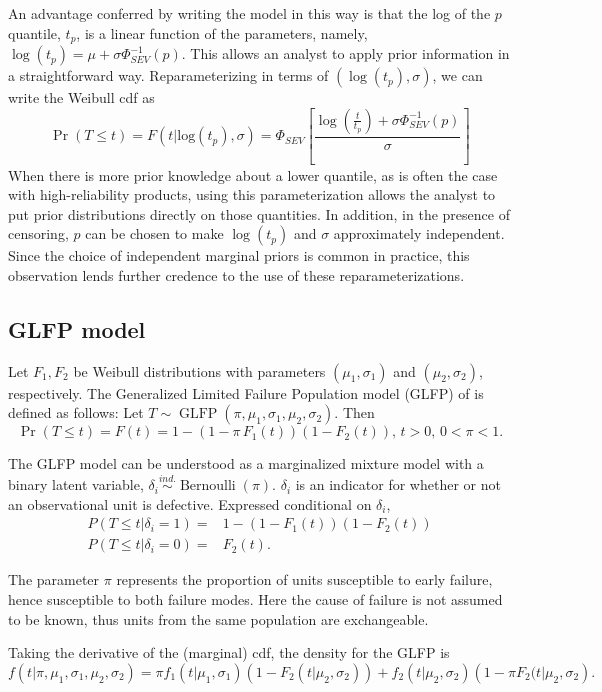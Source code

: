 \documentclass[12pt]{article}
\newcommand{\ind}{\stackrel{ind.}{\sim}}
\newcommand{\op}{\operatorname}
\begin{document}
An advantage conferred by writing the model in this way is that the log of the $p$ quantile, $t_p$, is a linear function of the parameters, namely, $\log(t_p) = \mu + \sigma \Phi_{SEV}^{-1}(p)$. This allows an analyst to apply prior information in a straightforward way. Reparameterizing in terms of $(\log(t_p),\sigma)$, we can write the Weibull cdf as
\begin{equation}
\Pr(T \le t) = F(t|\text{log}(t_p), \sigma) = \Phi_{SEV}\left[\frac{\log(\frac{t}{t_p}) + \sigma \Phi_{SEV}^{-1}(p)}{\sigma}\right]
\end{equation}
When there is more prior knowledge about a lower quantile, as is often the case with high-reliability products, using this parameterization allows the analyst to put prior distributions directly on those quantities. In addition, in the presence of censoring, $p$ can be chosen to make $\log(t_p)$ and $\sigma$ approximately independent. Since the choice of independent marginal priors is common in practice, this observation lends further credence to the use of these reparameterizations.


\subsection{GLFP model}
\label{subsec:GLFP model}
Let $F_1,F_2$ be Weibull distributions with parameters $(\mu_1,\sigma_1)$ and $(\mu_2, \sigma_2)$, respectively.
The Generalized Limited Failure Population model (GLFP) of \citet{chan} is defined as follows: Let $T \sim \op{GLFP}(\pi, \mu_1,\sigma_1,\mu_2,\sigma_2)$. Then
$$\Pr(T \le t) = F(t) = 1 - (1-\pi\, F_{1}(t))(1 - F_{2}(t)),\, t>0,\, 0 < \pi < 1.$$

The GLFP model can be understood as a marginalized mixture model with a binary latent variable, $\delta_i\ind \op{Bernoulli}(\pi)$. $\delta_i$ is an indicator for whether or not an observational unit is defective. Expressed conditional on $\delta_i$,
\begin{align*}
P(T\le t | \delta_i=1) =& 1 -(1-F_1(t))(1-F_2(t))\\
P(T\le t | \delta_i=0) =& F_2(t).
\end{align*}

 
The parameter $\pi$ represents the proportion of units susceptible to early failure, hence susceptible to both failure modes. Here the cause of failure is not assumed to be known, thus units from the same population are exchangeable.

Taking the derivative of the (marginal) cdf, the density for the GLFP is
\begin{equation}
f(t|\pi, \mu_1,\sigma_1, \mu_2, \sigma_2) = \pi f_1(t|\mu_1,\sigma_1)\left(1-F_2(t|\mu_2,\sigma_2)\right) + f_2(t|\mu_2,\sigma_2)\left(1-\pi F_2(t|\mu_2,\sigma_2\right).
\end{equation}
\end{document}
